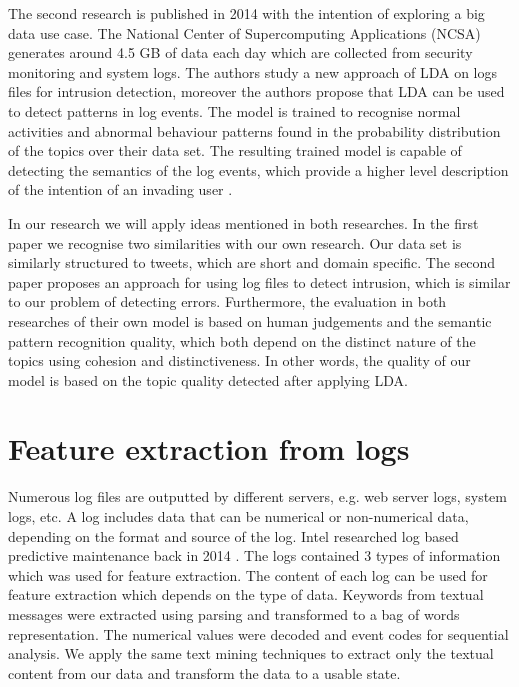 The second research is published in 2014 with the intention of exploring a big data use case. The National Center of Supercomputing Applications (NCSA) generates around 4.5 GB of data each day which are collected from security monitoring and system logs. The authors study a new approach of LDA on logs files for intrusion detection, moreover the authors propose that LDA can be used to detect patterns in log events. The model is trained to recognise normal activities and abnormal behaviour patterns found in the probability distribution of the topics over their data set. The resulting trained model is capable of detecting the semantics of the log events, which provide a higher level description of the intention of an invading user \cite{Jingwei2014KnowledgeLDA}. 

In our research we will apply ideas mentioned in both researches. In the first paper we recognise two similarities with our own research. Our data set is similarly structured to tweets, which are short and domain specific. The second paper proposes an approach for using log files to detect intrusion, which is similar to our problem of detecting errors. Furthermore, the evaluation in both researches of their own model is based on human judgements and the semantic pattern recognition quality, which both depend on the distinct nature of the topics using cohesion and distinctiveness. In other words, the quality of our model is based on the topic quality detected after applying LDA.

\section{Feature extraction from logs}\label{research:featureextraction}
Numerous log files are outputted by different servers, e.g. web server logs, system logs, etc. A log includes data that can be numerical or non-numerical data, depending on the format and source of the log. Intel researched log based predictive maintenance back in 2014 \cite{Sipos2014Log-basedMaintenance}. The logs contained 3 types of information which was used for feature extraction. 
The content of each log can be used for feature extraction which depends on the type of data.
Keywords from textual messages were extracted using parsing and transformed to a bag of words representation. The numerical values were decoded and event codes for sequential analysis. We apply the same text mining techniques to extract only the textual content from our data and transform the data to a usable state.


